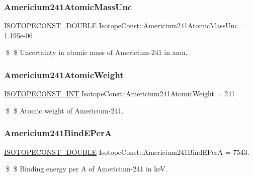 \subsubsection{\texorpdfstring{Americium241\+Atomic\+Mass\+Unc}{Americium241AtomicMassUnc}}
{\footnotesize\ttfamily \mbox{\hyperlink{group___isotope_const-_macros_ga8f45a7272ce02c0b4c65c44636ed719a}{I\+S\+O\+T\+O\+P\+E\+C\+O\+N\+S\+T\+\_\+\+D\+O\+U\+B\+LE}} Isotope\+Const\+::\+Americium241\+Atomic\+Mass\+Unc = 1.\+195e-\/06}

\$ \$ Uncertainty in atomic mass of Americium-\/241 in amu. \mbox{\label{group___isotope_const-_americium-_am241_gaa33bc8b4fb06767cedafef9e2756fad4}} 
\subsubsection{\texorpdfstring{Americium241\+Atomic\+Weight}{Americium241AtomicWeight}}
{\footnotesize\ttfamily \mbox{\hyperlink{group___isotope_const-_macros_ga5f18360b3e99483a35c32d789e62621c}{I\+S\+O\+T\+O\+P\+E\+C\+O\+N\+S\+T\+\_\+\+I\+NT}} Isotope\+Const\+::\+Americium241\+Atomic\+Weight = 241}

\$ \$ Atomic weight of Americium-\/241. \mbox{\label{group___isotope_const-_americium-_am241_gaff4e66015a67c0a00f20d64552392d14}} 
\subsubsection{\texorpdfstring{Americium241\+Bind\+E\+PerA}{Americium241BindEPerA}}
{\footnotesize\ttfamily \mbox{\hyperlink{group___isotope_const-_macros_ga8f45a7272ce02c0b4c65c44636ed719a}{I\+S\+O\+T\+O\+P\+E\+C\+O\+N\+S\+T\+\_\+\+D\+O\+U\+B\+LE}} Isotope\+Const\+::\+Americium241\+Bind\+E\+PerA = 7543.}

\$ \$ Binding energy per A of Americium-\/241 in keV. \mbox{\label{group___isotope_const-_americium-_am241_gae6d9d03acd6d8b543e9eef81295445f9}} 
